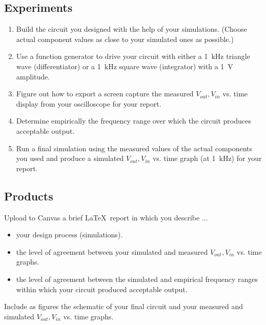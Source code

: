 \documentclass[11pt]{article}
\begin{document}
\subsection*{Experiments}
\begin{enumerate}
\item Build the circuit you designed with the help of your
  simulations. (Choose actual component values as close to your
  simulated ones as possible.)

\item Use a function generator to drive your circuit with either a
  1~kHz triangle wave (differentiator) or a 1~kHz square wave
  (integrator) with a 1~V amplitude.

\item Figure out how to export a screen capture the measured $V_{out},
  V_{in}$ vs. time display from your oscilloscope for your report.

\item Determine empirically the frequency range over which the circuit
  produces acceptable output.
  
\item Run a final simulation using the measured values of the actual
  components you used and produce a simulated $V_{out}, V_{in}$
  vs. time graph (at 1~kHz) for your report.
  
\end{enumerate}

\subsection*{Products}

Upload to Canvas a brief \LaTeX\ report in which you describe ...
\begin{itemize}
\item your design process (simulations).

\item the level of agreement between your simulated and measured
  $V_{out}, V_{in}$  vs. time graphs. 

\item the level of agreement between the simulated and empirical
  frequency ranges within which your circuit produced acceptable
  output.
  
\end{itemize}
Include as figures the schematic of your final circuit and your
measured and simulated $V_{out}, V_{in}$ vs. time graphs.
\end{document}
